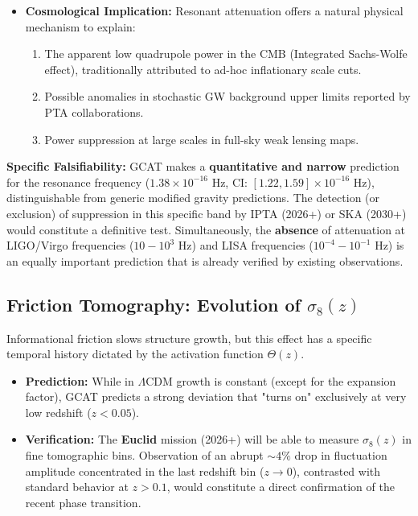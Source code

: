 \documentclass[12pt, a4paper]{article}
\theoremstyle{plain}
\theoremstyle{definition}
\begin{document}
\begin{itemize}
    \item \textbf{Cosmological Implication:} Resonant attenuation offers a natural physical mechanism to explain:
    \begin{enumerate}
        \item The apparent low quadrupole power in the CMB (Integrated Sachs-Wolfe effect), traditionally attributed to ad-hoc inflationary scale cuts.
        \item Possible anomalies in stochastic GW background upper limits reported by PTA collaborations.
        \item Power suppression at large scales in full-sky weak lensing maps.
    \end{enumerate}
\end{itemize}

\textbf{Specific Falsifiability:} GCAT makes a \textbf{quantitative and narrow} prediction for the resonance frequency ($1.38 \times 10^{-16}$ Hz, CI: $[1.22, 1.59] \times 10^{-16}$ Hz), distinguishable from generic modified gravity predictions. The detection (or exclusion) of suppression in this specific band by IPTA (2026+) or SKA (2030+) would constitute a definitive test. Simultaneously, the \textbf{absence} of attenuation at LIGO/Virgo frequencies ($10-10^3$ Hz) and LISA frequencies ($10^{-4}-10^{-1}$ Hz) is an equally important prediction that is already verified by existing observations.

\subsection{Friction Tomography: Evolution of \texorpdfstring{$\sigma_8(z)$}{sigma8(z)}}

Informational friction slows structure growth, but this effect has a specific temporal history dictated by the activation function $\Theta(z)$.

\begin{itemize}
    \item \textbf{Prediction:} While in $\Lambda$CDM growth is constant (except for the expansion factor), GCAT predicts a strong deviation that "turns on" exclusively at very low redshift ($z < 0.05$).
    \item \textbf{Verification:} The \textbf{Euclid} mission (2026+) will be able to measure $\sigma_8(z)$ in fine tomographic bins. Observation of an abrupt $\sim 4\%$ drop in fluctuation amplitude concentrated in the last redshift bin ($z \to 0$), contrasted with standard behavior at $z > 0.1$, would constitute a direct confirmation of the recent phase transition.
\end{itemize}
\end{document}
